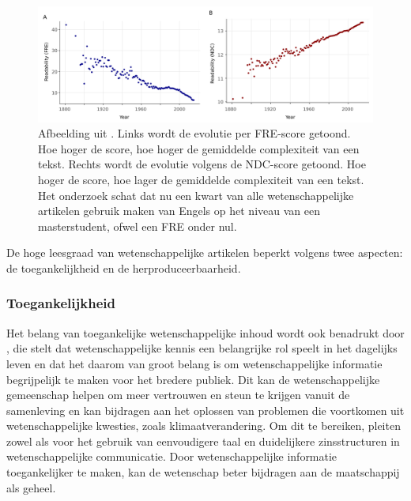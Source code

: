 \begin{figure}[H]
	\includegraphics[width=\linewidth]{img/fre-ndc.png}
	\caption{Afbeelding uit \textcite{PlavenSigray2017}. Links wordt de evolutie per FRE-score getoond. Hoe hoger de score, hoe hoger de gemiddelde complexiteit van een tekst. Rechts wordt de evolutie volgens de NDC-score getoond. Hoe hoger de score, hoe lager de gemiddelde complexiteit van een tekst. Het onderzoek schat dat nu een kwart van alle wetenschappelijke artikelen gebruik maken van Engels op het niveau van een masterstudent, ofwel een FRE onder nul.}
\end{figure}

De hoge leesgraad van wetenschappelijke artikelen beperkt volgens \textcite{PlavenSigray2017} twee aspecten: de toegankelijkheid en de herproduceerbaarheid.

\subsubsection{Toegankelijkheid}
Het belang van toegankelijke wetenschappelijke inhoud wordt ook benadrukt door \textcite{Snow2010}, die stelt dat wetenschappelijke kennis een belangrijke rol speelt in het dagelijks leven en dat het daarom van groot belang is om wetenschappelijke informatie begrijpelijk te maken voor het bredere publiek. Dit kan de wetenschappelijke gemeenschap helpen om meer vertrouwen en steun te krijgen vanuit de samenleving en kan bijdragen aan het oplossen van problemen die voortkomen uit wetenschappelijke kwesties, zoals klimaatverandering. Om dit te bereiken, pleiten zowel \textcite{Ennals2010} als \textcite{Snow2010} voor het gebruik van eenvoudigere taal en duidelijkere zinsstructuren in wetenschappelijke communicatie. Door wetenschappelijke informatie toegankelijker te maken, kan de wetenschap beter bijdragen aan de maatschappij als geheel.

